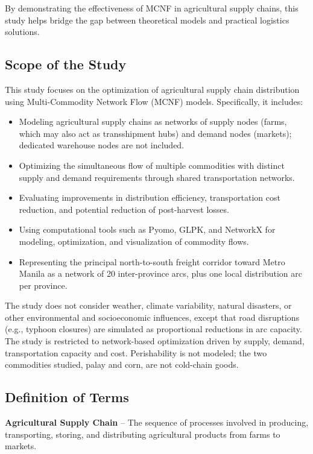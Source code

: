 \documentclass{icsthesis}
\begin{document}
\begin{mainmatter}
By demonstrating the effectiveness of MCNF in agricultural supply chains, this study helps bridge the gap between theoretical models and practical logistics solutions.

\subsection{Scope of the Study}
This study focuses on the optimization of agricultural supply chain distribution using Multi-Commodity Network Flow (MCNF) models. Specifically, it includes:

\begin{itemize}
    \item Modeling agricultural supply chains as networks of supply nodes (farms, which may also act as transshipment hubs) and demand nodes (markets); dedicated warehouse nodes are not included.
    \item Optimizing the simultaneous flow of multiple commodities with distinct supply and demand requirements through shared transportation networks.
    \item Evaluating improvements in distribution efficiency, transportation cost reduction, and potential reduction of post-harvest losses.
    \item Using computational tools such as Pyomo, GLPK, and NetworkX for modeling, optimization, and visualization of commodity flows.
    \item Representing the principal north-to-south freight corridor toward Metro Manila as a network of 20 inter-province arcs, plus one local distribution arc per province.
\end{itemize}

The study does not consider weather, climate variability, natural disasters, or other environmental and socioeconomic influences, except that road disruptions (e.g., typhoon closures) are simulated as proportional reductions in arc capacity. The study is restricted to network-based optimization driven by supply, demand, transportation capacity and cost. Perishability is not modeled; the two commodities studied, palay and corn, are not cold-chain goods.

\subsection{Definition of Terms}

\textbf{Agricultural Supply Chain} – The sequence of processes involved in producing, transporting, storing, and distributing agricultural products from farms to markets.


\end{mainmatter}
\end{document}
